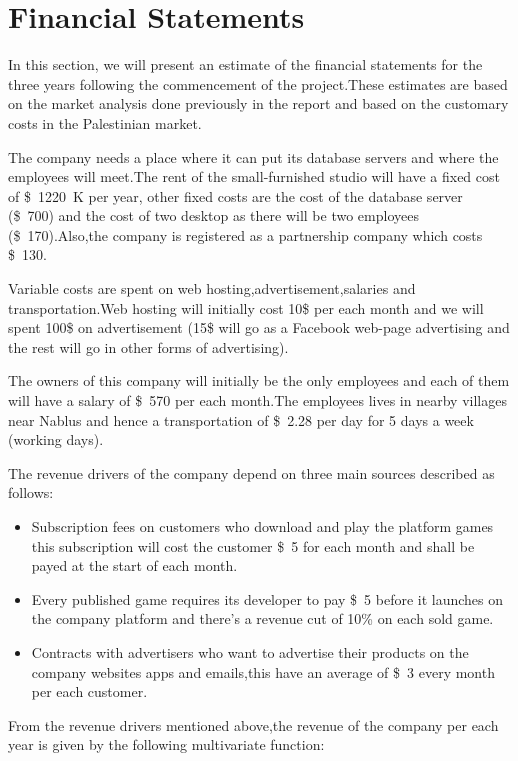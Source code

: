 \documentclass[fontsize=14pt,svgnames]{scrreprt}
\begin{document}
\chapter{Financial Statements}
In this section, we will present an estimate of the financial statements for the three years following the commencement of the project.These estimates are based on the market analysis done previously in the report and based on the customary costs in the Palestinian market.
\par The company needs a place where it can put its database servers and where the employees will meet.The rent of the small-furnished studio will have a fixed cost of \SI{1220}[\$]{K} per year, other fixed costs are the cost of the database server (\SI{700}[\$]{}) and the cost of two desktop as there will be two employees (\SI{170}[\$]{}).Also,the company is registered as a partnership company which costs \SI{130}[\$]{}. 
\par Variable costs are spent on web hosting,advertisement,salaries and transportation.Web hosting will initially cost 10\$ per each month and we will spent 100\$ on advertisement (15\$ will go as a Facebook web-page advertising and the rest will go in other forms of advertising).\par The owners of this company will initially be the only employees and each of them will have a salary of \SI{570}[\$]{} per each month.The employees lives in nearby villages near Nablus and hence a transportation of \SI{2.28}[\$]{} per day for 5 days a week (working days).
\par The revenue drivers of the company depend on three main sources described as follows:
\begin{itemize}
\item Subscription fees on customers who download and play the platform games this subscription will cost the customer \SI{5}[\$]{} for each month and shall be payed at the start of each month.
\item Every published game requires its developer to pay \SI{5}[\$]{} before it launches on the company platform and there's a revenue cut of 10\% on each sold game.
\item Contracts with advertisers who want to advertise their products on the company websites apps and emails,this have an average of  \SI{3}[\$]{} every month per each customer.     
\end{itemize}
\par From the revenue drivers mentioned above,the revenue of the company per each year is given by the following multivariate function:
\end{document}
